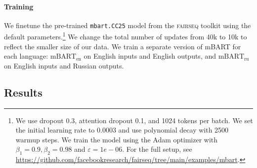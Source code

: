 \paragraph{Training} We finetune the pre-trained \texttt{mbart.CC25} model from the \textsc{fairseq} toolkit \citep{ott2019fairseq} using the default parameters.\footnote{We use dropout 0.3, attention dropout 0.1, and 1024 tokens per batch. We set the initial learning rate to 0.0003 and use polynomial decay with 2500 warmup steps. We train the model using the Adam optimizer \cite{kingma2014adam} with $\beta_1=0.9, \beta_2=0.98$ and $\varepsilon=1e-06$. For the full setup, see \url{https://github.com/facebookresearch/fairseq/tree/main/examples/mbart}.} We change the total number of updates from 40k to 10k to reflect the smaller size of our data. We train a separate version of mBART for each language: $\text{mBART}_{\text{en}}$ on English inputs and English outputs, and $\text{mBART}_{\text{ru}}$ on English inputs and Russian outputs.



\subsection{Results}

